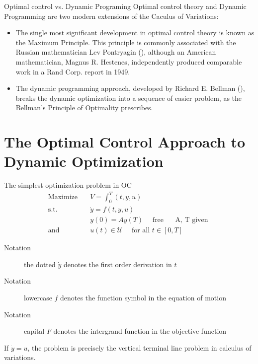 \documentclass[10pt]{beamer}
\begin{document}
\begin{frame}[label={sec:org2f3efa0}]{Optimal control vs. Dynamic Programing}
\alert{Optimal control theory} and \alert{Dynamic Programming} are two modern extensions of the Caculus of Variations:

\begin{itemize}
\item The single most significant development in optimal control theory is known as the \alert{Maximum Principle}. This principle is commonly associated with the Russian mathematician Lev Pontryagin (\cite{pontryagin2018mathematical}), although an American mathematician, Magnus R. Hestenes, independently produced comparable work in a Rand Corp. report in 1949.
\item The dynamic programming approach, developed by Richard E. Bellman (\cite{Bellman1954}), breaks the dynamic optimization into a sequence of easier problem, as the Bellman's \alert{Principle of Optimality} prescribes.
\end{itemize}
\end{frame}

\section{The Optimal Control Approach to Dynamic Optimization}
\label{sec:orgcd7d3fb}
\begin{frame}[label={sec:orgc985e29}]{The simplest optimization problem in OC}
\begin{align*}
\text{Maximize} \quad & V = \int_0^T(t, y, u)  \\
\text{s.t.} \quad     & \dot{y} = f(t,y,u)  \\
                  & y(0) = A y(T) \quad \text{ free } \quad \text{ A, T given } \\
\text{and} \quad      & u(t) \in \mathscr{U} \quad \text{ for all } t \in [0, T]
\end{align*}

\begin{description}
\item[{Notation}] the dotted \(\dot{y}\) denotes the first order derivation in \(t\)
\item[{Notation}] lowercase \(f\) denotes the function symbol in the equation of motion
\item[{Notation}] capital \(F\) denotes the intergrand function in the objective function
\end{description}

If \(\dot{y} = u\), the problem is precisely the vertical terminal line problem in calculus of variations.
\end{frame}
\end{document}
